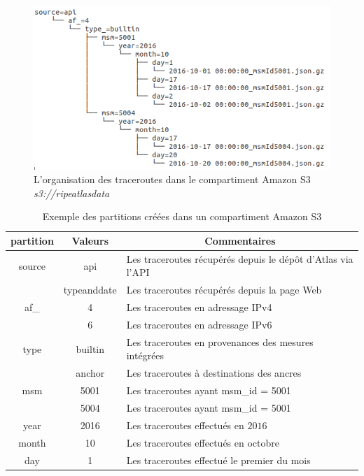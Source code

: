 \begin{figure}[h]
	\centering
	\captionsetup{justification=centering}
	\includegraphics[width=1\linewidth]{illustrations/partitionnement-athena}
	\caption{L'organisation des traceroutes dans le compartiment Amazon S3 \textit{s3://ripeatlasdata}}
	\label{fig:partitionnement-athenaa}
\end{figure}

\begin{table}[h]
	\centering
	\captionsetup{justification=centering}
	\begin{tabular}{|c|c|l|}
		\hline 
		\textbf{partition}	& \textbf{Valeurs} & \multicolumn{1}{c|}{\textbf{Commentaires} }\\ 
		\hline 
		source& api & Les  traceroutes récupérés depuis le dépôt  d'Atlas via l'API \\ 
		\cline{2-3}
		&typeanddate& Les  traceroutes récupérés depuis la page Web\\
		\hline 
		af\_& 4  & Les traceroutes en adressage IPv4 \\ 
		\cline{2-3} &6& Les traceroutes en adressage IPv6\\	\hline 
		type& builtin  & Les traceroutes en provenances des mesures intégrées \\ 
		\cline{2-3} 
		&anchor& Les traceroutes à destinations des ancres\\ \hline
		msm& 5001 & Les traceroutes ayant msm\_id = 5001 \\ 
		\cline{2-3}  &5004& Les traceroutes ayant msm\_id = 5001 \\
		\hline 
		year& 2016 & Les traceroutes effectués en $2016$ \\ 
		\hline 
		month& 10 & Les traceroutes effectués en octobre \\ 
		\hline 
		day& 1 & Les traceroutes effectué le premier du mois \\ 
		\hline 
	\end{tabular}
	\caption{Exemple des partitions créées dans un compartiment Amazon S3} 
	\label{tab:partition-description}
\end{table}

